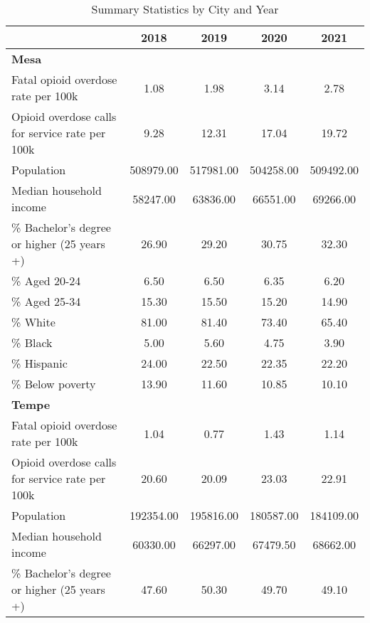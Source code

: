 \begin{table}[htbp]\centering
\def\sym#1{\ifmmode^{#1}\else\(^{#1}\)\fi}
\caption{\centering Summary Statistics by City and Year}
\begin{adjustbox}{max width=\linewidth}\begin{tabular}{l*{4}{c}}
\toprule
                    &        2018&        2019&        2020&        2021\\
\midrule
\textbf{Mesa}                &            &            &            &            \\
Fatal opioid overdose rate per 100k&        1.08&        1.98&        3.14&        2.78\\
Opioid overdose calls for service rate per 100k&        9.28&       12.31&       17.04&       19.72\\
Population          &   508979.00&   517981.00&   504258.00&   509492.00\\
Median household income&    58247.00&    63836.00&    66551.00&    69266.00\\
\% Bachelor's degree or higher (25 years +)&       26.90&       29.20&       30.75&       32.30\\
\% Aged 20-24       &        6.50&        6.50&        6.35&        6.20\\
\% Aged 25-34       &       15.30&       15.50&       15.20&       14.90\\
\% White            &       81.00&       81.40&       73.40&       65.40\\
\% Black            &        5.00&        5.60&        4.75&        3.90\\
\% Hispanic         &       24.00&       22.50&       22.35&       22.20\\
\% Below poverty    &       13.90&       11.60&       10.85&       10.10\\
\midrule
\textbf{Tempe}               &            &            &            &            \\
Fatal opioid overdose rate per 100k&        1.04&        0.77&        1.43&        1.14\\
Opioid overdose calls for service rate per 100k&       20.60&       20.09&       23.03&       22.91\\
Population          &   192354.00&   195816.00&   180587.00&   184109.00\\
Median household income&    60330.00&    66297.00&    67479.50&    68662.00\\
\% Bachelor's degree or higher (25 years +)&       47.60&       50.30&       49.70&       49.10\\

\end{tabular}
\end{adjustbox}
\end{table}
